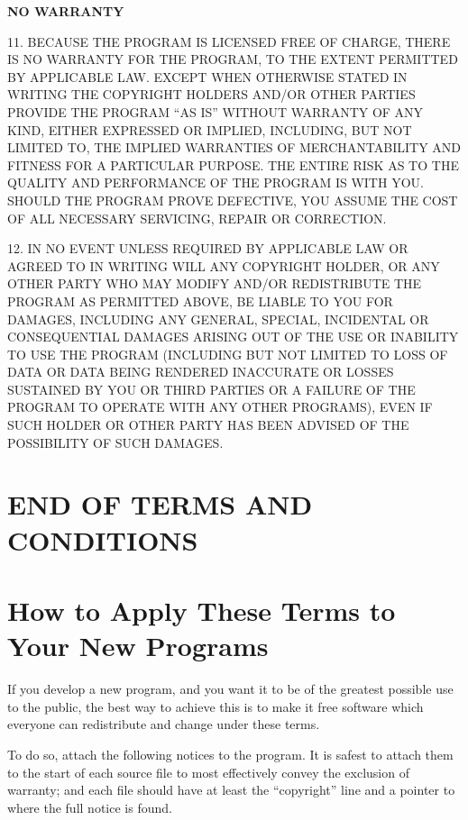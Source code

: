 \vspace{2 ex}

\centerline{\bf NO WARRANTY}

\vspace{2 ex}

  11. BECAUSE THE PROGRAM IS LICENSED FREE OF CHARGE, THERE IS NO WARRANTY
FOR THE PROGRAM, TO THE EXTENT PERMITTED BY APPLICABLE LAW.  EXCEPT WHEN
OTHERWISE STATED IN WRITING THE COPYRIGHT HOLDERS AND/OR OTHER PARTIES
PROVIDE THE PROGRAM ``AS IS'' WITHOUT WARRANTY OF ANY KIND, EITHER EXPRESSED
OR IMPLIED, INCLUDING, BUT NOT LIMITED TO, THE IMPLIED WARRANTIES OF
MERCHANTABILITY AND FITNESS FOR A PARTICULAR PURPOSE.  THE ENTIRE RISK AS
TO THE QUALITY AND PERFORMANCE OF THE PROGRAM IS WITH YOU.  SHOULD THE
PROGRAM PROVE DEFECTIVE, YOU ASSUME THE COST OF ALL NECESSARY SERVICING,
REPAIR OR CORRECTION.

  12. IN NO EVENT UNLESS REQUIRED BY APPLICABLE LAW OR AGREED TO IN WRITING
WILL ANY COPYRIGHT HOLDER, OR ANY OTHER PARTY WHO MAY MODIFY AND/OR
REDISTRIBUTE THE PROGRAM AS PERMITTED ABOVE, BE LIABLE TO YOU FOR DAMAGES,
INCLUDING ANY GENERAL, SPECIAL, INCIDENTAL OR CONSEQUENTIAL DAMAGES ARISING
OUT OF THE USE OR INABILITY TO USE THE PROGRAM (INCLUDING BUT NOT LIMITED
TO LOSS OF DATA OR DATA BEING RENDERED INACCURATE OR LOSSES SUSTAINED BY
YOU OR THIRD PARTIES OR A FAILURE OF THE PROGRAM TO OPERATE WITH ANY OTHER
PROGRAMS), EVEN IF SUCH HOLDER OR OTHER PARTY HAS BEEN ADVISED OF THE
POSSIBILITY OF SUCH DAMAGES.

\section*{END OF TERMS AND CONDITIONS}

\section*{How to Apply These Terms to Your New Programs}

  If you develop a new program, and you want it to be of the greatest
possible use to the public, the best way to achieve this is to make it
free software which everyone can redistribute and change under these terms.

  To do so, attach the following notices to the program.  It is safest
to attach them to the start of each source file to most effectively
convey the exclusion of warranty; and each file should have at least
the ``copyright'' line and a pointer to where the full notice is found.

